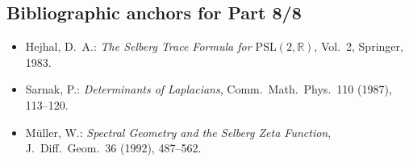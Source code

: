 \subsection{Bibliographic anchors for Part 8/8}
\label{subsec:ch4-part8-bib-anchors} \relax

\begin{itemize}
  \item Hejhal, D.~A.: \emph{The Selberg Trace Formula for $\mathrm{PSL}(2,\mathbb{R})$}, Vol.~2, Springer, 1983. %
  \item Sarnak, P.: \emph{Determinants of Laplacians}, Comm.\ Math.\ Phys.\ 110 (1987), 113–120. %
  \item Müller, W.: \emph{Spectral Geometry and the Selberg Zeta Function}, J.\ Diff.\ Geom.\ 36 (1992), 487–562. %
\end{itemize}

